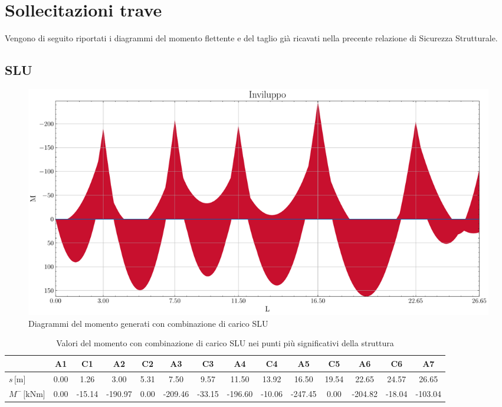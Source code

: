 \clearpage
\section{Sollecitazioni trave}
Vengono di seguito riportati i diagrammi del momento flettente e del taglio già ricavati nella precente relazione di Sicurezza Strutturale.
\begin{landscape}
\subsection{SLU}
\begin{figure}[H]
\centering
\includegraphics[height=0.6\textwidth]{IMG/diagrammi_trave/ULS_M.pdf}
\caption{Diagrammi del momento generati con combinazione di carico SLU}
\label{fig:trave_ULS_momento}
\end{figure}
\begin{table}[H]
\footnotesize
\centering
\caption{Valori del momento con combinazione di carico SLU nei punti più significativi della struttura}
\label{tab:trave_ULS_momento}
	\begin{tabular}{lS[table-format=-3.2]S[table-format=-3.2]S[table-format=-3.2]S[table-format=-3.2]S[table-format=-3.2]S[table-format=-3.2]S[table-format=-3.2]S[table-format=-3.2]S[table-format=-3.2]S[table-format=-3.2]S[table-format=-3.2]S[table-format=-3.2]S[table-format=-3.2]}
		\toprule
		{} & {A1} & {C1} & {A2} & {C2} & {A3} & {C3} & {A4} & {C4} & {A5} & {C5} & {A6} & {C6} & {A7} \\
		\midrule
		$s\,\si{[\metre]}$ & 0.00 & 1.26 & 3.00 & 5.31 & 7.50 & 9.57 & 11.50 & 13.92 & 16.50 & 19.54 & 22.65 & 24.57 & 26.65 \\
        $M^{-}\,\si{[\kilo\newton\metre]}$ & 0.00 & -15.14 & -190.97 & 0.00 & -209.46 & -33.15 & -196.60 & -10.06 & -247.45 & 0.00 & -204.82 & -18.04 & -103.04 \\

\end{tabular}
\end{table}
\end{landscape}
